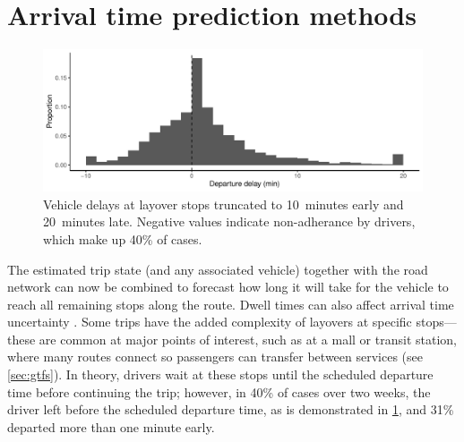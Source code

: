 \section{Arrival time prediction methods}
\label{sec:prediction_arrival_time}




\begin{knitrout}\small
{}\color{fgcolor}\begin{figure}

{\centering \includegraphics[width=\linewidth]{figure/layover_observance-1} 

}

\caption[Vehicle delays at layover stops]{Vehicle delays at layover stops truncated to 10~minutes early and 20~minutes late. Negative values indicate non-adherance by drivers, which make up 40\% of cases.}\label{fig:layover_observance}
\end{figure}


\end{knitrout}

The estimated trip state (and any associated vehicle) together with the road network can now be combined to forecast how long it will take for the vehicle to reach all remaining stops along the route. Dwell times can also affect arrival time uncertainty \citep{Shen_2013,Wang_2016,Robinson_2013,Meng_2013,Shalaby_2004,Hans_2015}. Some trips have the added complexity of layovers at specific stops---these are common at major points of interest, such as at a mall or transit station, where many routes connect so passengers can transfer between services (see \cref{sec:gtfs}). In theory, drivers wait at these stops until the scheduled departure time before continuing the trip; however, in 40\% of cases over two weeks, the driver left before the scheduled departure time, as is demonstrated in \cref{fig:layover_observance}, and 31\% departed more than one minute early.


